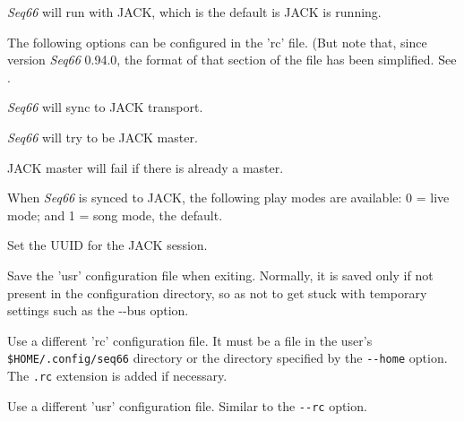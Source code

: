 
      \textsl{Seq66} will run with JACK, which is the default is JACK is
      running.

   The following options can be configured in the 'rc' file. (But note that, since
   version \textsl{Seq66} 0.94.0, the format of that section of the file has been
   simplified.
   See .


      \textsl{Seq66} will sync to JACK transport.


      \textsl{Seq66} will try to be JACK master.


      JACK master will fail if there is already a master.


      When \textsl{Seq66} is synced to JACK, the following play modes
      are available: 0 = live mode; and 1 = song mode, the default.


      Set the UUID for the JACK session.

      Save the 'usr' configuration file when exiting.
      Normally, it is saved only if not present in the configuration directory,
      so as not to get stuck with temporary settings such as the -{}-bus option.


      Use a different 'rc' configuration file.
      It must be a file in the user's \texttt{\$HOME/.config/seq66}
      directory or the directory specified by the \texttt{-{}-home} option.
      The \texttt{.rc} extension is added if necessary.

      Use a different 'usr' configuration file.  Similar to the \texttt{-{}-rc}
      option.

